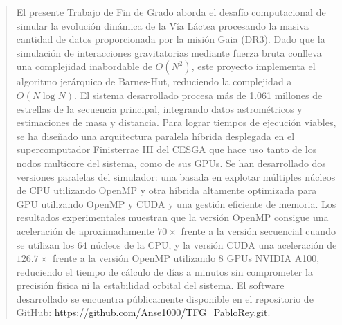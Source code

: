 
\pagestyle{empty}
\begin{abstract}

    El presente Trabajo de Fin de Grado aborda el desafío computacional de simular la evolución dinámica de la Vía Láctea procesando la masiva cantidad de datos proporcionada por la misión Gaia (DR3).
    Dado que la simulación de interacciones gravitatorias mediante fuerza bruta conlleva una complejidad inabordable de $O(N^2)$, este proyecto implementa el algoritmo jerárquico de Barnes-Hut, reduciendo la complejidad a $O(N \log N)$.
    El sistema desarrollado procesa más de 1.061 millones de estrellas de la secuencia principal, integrando datos astrométricos y estimaciones de masa y distancia.
    Para lograr tiempos de ejecución viables, se ha diseñado una arquitectura paralela híbrida desplegada en el supercomputador Finisterrae III del CESGA que hace uso tanto de los nodos multicore del sistema, como de sus GPUs.
    Se han desarrollado dos versiones paralelas del simulador: una basada en explotar múltiples núcleos de CPU utilizando OpenMP y otra híbrida altamente optimizada para GPU utilizando OpenMP y CUDA y una gestión eficiente de memoria.
    Los resultados experimentales muestran que la versión OpenMP consigue una aceleración de aproximadamente $70\times$ frente a la versión secuencial cuando se utilizan los 64 núcleos de la CPU, y la versión CUDA una aceleración de $126.7\times$ frente a la versión OpenMP utilizando 8 GPUs NVIDIA A100, reduciendo el tiempo de cálculo de días a minutos sin comprometer la precisión física ni la estabilidad orbital del sistema.
    El software desarrollado se encuentra públicamente disponible en el repositorio de GitHub: \url{https://github.com/Anse1000/TFG_PabloRey.git}.

    \vspace*{25pt}
    \begin{segundoresumo}


\end{segundoresumo}
\end{abstract}
